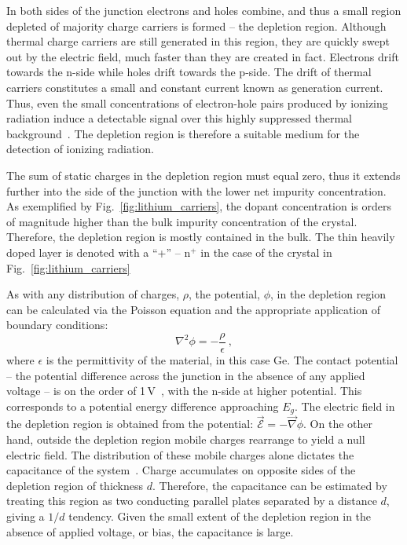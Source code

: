 In both sides of the junction electrons and holes combine, and thus a small region depleted of majority charge carriers is formed -- the depletion region. Although thermal charge carriers are still generated in this region, they are quickly swept out by the electric field, much faster than they are created in fact. Electrons drift towards the n-side while holes drift towards the p-side. The drift of thermal carriers constitutes a small and constant current known as generation current. Thus, even the small concentrations of electron-hole pairs produced by ionizing radiation induce a detectable signal over this highly suppressed thermal background~\cite{knoll}. The depletion region is therefore a suitable medium for the detection of ionizing radiation.

The sum of static charges in the depletion region must equal zero, thus it extends further into the side of the junction with the lower net impurity concentration. As exemplified by Fig.~\ref{fig:lithium_carriers}, the dopant concentration is orders of magnitude higher than the bulk impurity concentration of the crystal. Therefore, the depletion region is mostly contained in the bulk. The thin heavily doped layer is denoted with a ``+'' -- n$^+$ in the case of the crystal in Fig.~\ref{fig:lithium_carriers} 

As with any distribution of charges, $\rho$, the potential, $\phi$, in the depletion region can be calculated via the Poisson equation and the appropriate application of boundary conditions:
\begin{equation}
	\nabla^2\phi=-\frac{\rho}{\epsilon}~,
	\label{eq:piosson}
\end{equation}
where $\epsilon$ is the permittivity of the material, in this case Ge. The contact potential -- the potential difference across the junction in the absence of any applied voltage -- is on the order of 1\,V~\cite{knoll}, with the n-side at higher potential. This corresponds to a potential energy difference approaching $E_g$. The electric field in the depletion region is obtained from the potential: $\vec{\mathcal{E}} =- \vec{\nabla} \phi$. On the other hand, outside the depletion region mobile charges rearrange to yield a null electric field. The distribution of these mobile charges alone dictates the capacitance of the system~\cite{gefica}. Charge accumulates on opposite sides of the depletion region of thickness $d$. Therefore, the capacitance can be estimated by treating this region as two conducting parallel plates separated by a distance $d$, giving a $1/d$ tendency. Given the small extent of the depletion region in the absence of applied voltage, or bias, the capacitance is large. 


